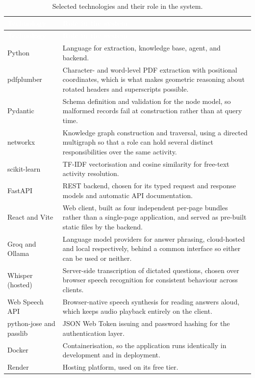 \begin{longtable}{|p{}|p{}|}
\caption{Selected technologies and their role in the system.}\label{tab:tech}\\
\hline
\rowcolor{myblue}\textcolor{white}{\textbf{Technology}} & \textcolor{white}{\textbf{Role in the system}} \\
\hline
\endfirsthead
\hline
\rowcolor{myblue}\textcolor{white}{\textbf{Technology}} & \textcolor{white}{\textbf{Role in the system}} \\
\hline
\endhead
Python & Language for extraction, knowledge base, agent, and backend. \\ \hline
pdfplumber\citep{pdfplumber} & Character- and word-level PDF extraction with positional coordinates, which is what makes geometric reasoning about rotated headers and superscripts possible. \\ \hline
Pydantic\citep{pydantic_docs} & Schema definition and validation for the node model, so malformed records fail at construction rather than at query time. \\ \hline
networkx\citep{hagberg2008networkx} & Knowledge graph construction and traversal, using a directed multigraph so that a role can hold several distinct responsibilities over the same activity. \\ \hline
scikit-learn\citep{pedregosa2011sklearn} & TF-IDF vectorisation and cosine similarity for free-text activity resolution. \\ \hline
FastAPI\citep{fastapi_docs} & REST backend, chosen for its typed request and response models and automatic API documentation. \\ \hline
React\citep{react_docs} and Vite\citep{vite_docs} & Web client, built as four independent per-page bundles rather than a single-page application, and served as pre-built static files by the backend. \\ \hline
Groq\citep{groq} and Ollama\citep{ollama} & Language model providers for answer phrasing, cloud-hosted and local respectively, behind a common interface so either can be used or neither. \\ \hline
Whisper (hosted)\citep{groq} & Server-side transcription of dictated questions, chosen over browser speech recognition for consistent behaviour across clients. \\ \hline
Web Speech API\citep{webspeech_api} & Browser-native speech synthesis for reading answers aloud, which keeps audio playback entirely on the client. \\ \hline
python-jose\citep{python_jose_docs} and passlib\citep{passlib_docs} & JSON Web Token issuing and password hashing for the authentication layer. \\ \hline
Docker\citep{docker_docs} & Containerisation, so the application runs identically in development and in deployment. \\ \hline
Render\citep{render_docs} & Hosting platform, used on its free tier. \\ \hline
\end{longtable}

